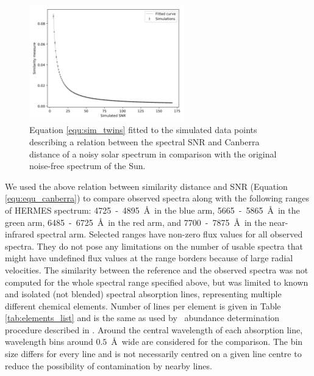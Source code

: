 \begin{figure}
	\centering
	\includegraphics[width=0.6\textwidth]{canberra_b2_flux0_05.png}
	\caption{Equation \ref{equ:sim_twins} fitted to the simulated data points describing a relation between the spectral SNR and Canberra distance of a noisy solar spectrum in comparison with the original noise-free spectrum of the Sun.}
	\label{fig:similarity_snr_twins}
\end{figure}

We used the above relation between similarity distance and SNR (Equation \ref{equ:equ_canberra}) to compare observed spectra along with the following ranges of HERMES spectrum: 4725~-~4895~\AA\ in the blue arm, 5665~-~5865~\AA\ in the green arm, 6485~-~6725~\AA\ in the red arm, and 7700~-~7875~\AA\ in the near-infrared spectral arm. Selected ranges have non-zero flux values for all observed spectra. They do not pose any limitations on the number of usable spectra that might have undefined flux values at the range borders because of large radial velocities. The similarity between the reference and the observed spectra was not computed for the whole spectral range specified above, but was limited to known and isolated (not blended) spectral absorption lines, representing multiple different chemical elements. Number of lines per element is given in Table \ref{tab:elements_list} and is the same as used by \TC\ abundance determination procedure described in \citet{buder2018}. Around the central wavelength of each absorption line, wavelength bins around $0.5$~\AA\ wide are considered for the comparison. The bin size differs for every line and is not necessarily centred on a given line centre \cite{buder2018} to reduce the possibility of contamination by nearby lines.

